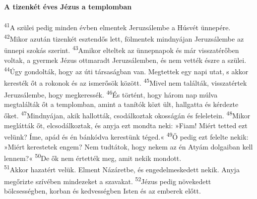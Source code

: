 \documentclass[10pt]{article}
\begin{document}
\begin{multicols}{2}
\paragraph*{A tizenkét éves Jézus a templomban}
\textsuperscript{41}A szülei pedig minden évben elmentek Jeruzsálembe a Húsvét ünnepére.  
\textsuperscript{42}Mikor azután tizenkét esztendős lett, fölmentek mindnyájan Jeruzsálembe az ünnepi szokás szerint.  
\textsuperscript{43}Amikor elteltek az ünnepnapok és már visszatérőben voltak, a gyermek Jézus ottmaradt Jeruzsálemben, és nem vették észre a szülei.  
\textsuperscript{44}Úgy gondolták, hogy az úti társaságban van. Megtettek egy napi utat, s akkor keresték őt a rokonok és az ismerősök között.  
\textsuperscript{45}Mivel nem találták, visszatértek Jeruzsálembe, hogy megkeressék.  
\textsuperscript{46}És történt, hogy három nap múlva megtalálták őt a templomban, amint a tanítók közt ült, hallgatta és kérdezte őket.  
\textsuperscript{47}Mindnyájan, akik hallották, csodálkoztak okosságán és feleletein.  
\textsuperscript{48}Mikor meglátták őt, elcsodálkoztak, és anyja ezt mondta neki: »Fiam! Miért tetted ezt velünk? Íme, apád és én bánkódva kerestünk téged.«  
\textsuperscript{49}Ő pedig ezt felelte nekik: »Miért kerestetek engem? Nem tudtátok, hogy nekem az én Atyám dolgaiban kell lennem?«  
\textsuperscript{50}De ők nem értették meg, amit nekik mondott. \\  
\textsuperscript{51}Akkor hazatért velük. Elment Názáretbe, és engedelmeskedett nekik. Anyja megőrizte szívében mindezeket a szavakat.  
\textsuperscript{52}Jézus pedig növekedett bölcsességben, korban és kedvességben Isten és az emberek előtt. \\ 
\end{multicols}
\end{document}
